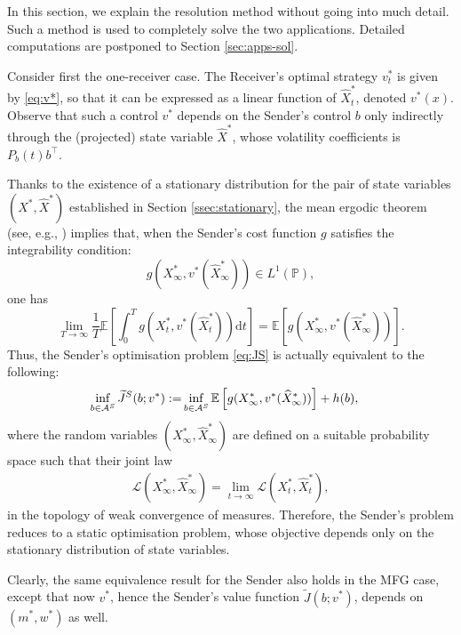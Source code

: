 \documentclass[a4paper,10pt]{article}
\newcommand{\EE}{\mathbb{E}}
\newcommand{\D}{\mathrm{d}}
\theoremstyle{definition}
\theoremstyle{plain}
\numberwithin{equation}{section}
\begin{document}
In this section, we explain the resolution method without going into much detail. Such a method is used to completely solve the two applications. Detailed computations are postponed to Section \ref{sec:apps-sol}.

Consider first the one-receiver case. The Receiver's optimal strategy $v^*_t$ is given by \eqref{eq:v*}, so that it can be expressed as a linear function of $\widehat X^* _t$, denoted $v^*(x)$. Observe that such a control $v^*$ depends on the Sender's control $b$ only indirectly through the (projected) state variable $\widehat X^*$, whose volatility coefficients is $P_b(t)b^\top$. 

Thanks to the existence of a stationary distribution for the pair of state variables $(X^*,\widehat X^*)$ established in Section \ref{ssec:stationary}, the mean ergodic theorem (see, e.g., \cite[Theorem 1.5.18]{araposthatis11}) implies that, when the Sender's cost function $g$ satisfies the integrability condition:
\begin{equation}\label{ass:g}
g(X_\infty ^*, v^* (\widehat X^* _\infty)) \in L^1 (\mathbb P),
\end{equation}
one has
\[  
	\lim_{T \to \infty} \frac{1}{T} \mathbb E\left[ \int_0 ^T g(X_t ^*, v^*(\widehat X_t ^*))\D t \right] = \mathbb E\left[g(X_\infty ^*, v^*(\widehat X_\infty ^*))\right].
\]
Thus, the Sender's optimisation problem \eqref{eq:JS} is actually equivalent to the following:
    \begin{align}\label{eq:JS2}
      \inf_{b \in \mathcal A^{\rm S}} \widetilde J^{\rm S} (b; v^*) := & \inf_{b \in \mathcal A^{\rm S}} \EE \left[g(X^*_{\infty},v^*(\widehat X^* _\infty))\right]+ h(b),
    \end{align}
    where the random variables $(X^*_{\infty},\widehat X^*_\infty)$ are defined on a suitable probability space such that their joint law
    \begin{align}
        \mathcal{L}(X^*_{\infty},\widehat{X}^*_\infty)
        =\lim_{t \to \infty}\mathcal{L}(X^*_t, \widehat{X}^*_t),
    \end{align}
    in the topology of weak convergence of measures. Therefore, the Sender's problem reduces to a static optimisation problem, whose objective depends only on the stationary distribution of state variables. 
    
    Clearly, the same equivalence result for the Sender also holds in the MFG case, except that now $v^*$, hence the Sender's value function $\tilde J(b;v^*)$, depends on $(m^*,w^*)$ as well. 
    
\end{document}
